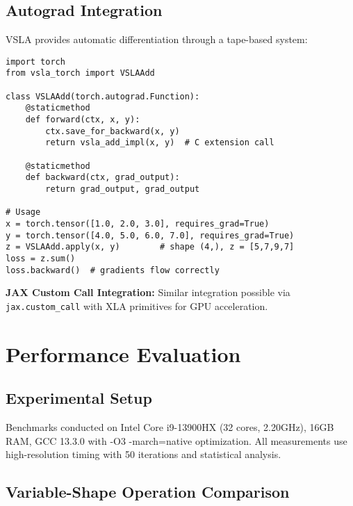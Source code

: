 \documentclass[sigconf,review]{acmart}
\begin{document}
\subsection{Autograd Integration}

VSLA provides automatic differentiation through a tape-based system:

\begin{tcolorbox}[colback=api,colframe=green!50!black,title=PyTorch Integration Example]
\begin{verbatim}
import torch
from vsla_torch import VSLAAdd

class VSLAAdd(torch.autograd.Function):
    @staticmethod
    def forward(ctx, x, y):
        ctx.save_for_backward(x, y)
        return vsla_add_impl(x, y)  # C extension call
    
    @staticmethod  
    def backward(ctx, grad_output):
        return grad_output, grad_output

# Usage
x = torch.tensor([1.0, 2.0, 3.0], requires_grad=True)
y = torch.tensor([4.0, 5.0, 6.0, 7.0], requires_grad=True)
z = VSLAAdd.apply(x, y)        # shape (4,), z = [5,7,9,7]
loss = z.sum()
loss.backward()  # gradients flow correctly
\end{verbatim}
\end{tcolorbox}

\textbf{JAX Custom Call Integration:} Similar integration possible via \texttt{jax.custom\_call} with XLA primitives for GPU acceleration.

\section{Performance Evaluation}
\label{sec:evaluation}

\subsection{Experimental Setup}

Benchmarks conducted on Intel Core i9-13900HX (32 cores, 2.20GHz), 16GB RAM, GCC 13.3.0 with -O3 -march=native optimization. All measurements use high-resolution timing with 50 iterations and statistical analysis.

\subsection{Variable-Shape Operation Comparison}
\end{document}
